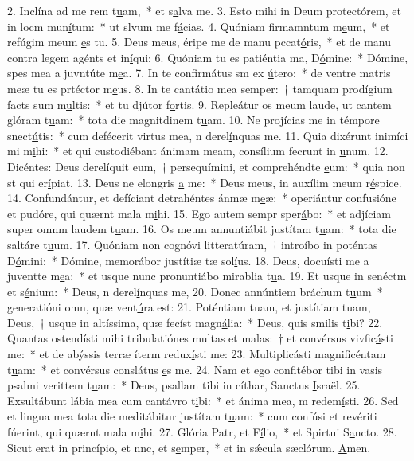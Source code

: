 2. Inclína ad me rem t\uline{u}am,~* et s\uline{a}lva me.
3. Esto mihi in Deum protectórem, et in locm mun\uline{í}tum:~* ut slvum me f\uline{á}cias.
4. Quóniam firmamntum m\uline{e}um,~* et refúgim meum \uline{e}s tu.
5. Deus meus, éripe me de manu pccat\uline{ó}ris,~* et de manu contra legem agénts et in\uline{í}qui:
6. Quóniam tu es patiéntia ma, D\uline{ó}mine:~* Dómine, spes mea a juvntúte m\uline{e}a.
7. In te confirmátus sm ex \uline{ú}tero:~* de ventre matris meæ tu es prtéctor m\uline{e}us.
8. In te cantátio mea semper:~† tamquam prodígium facts sum m\uline{u}ltis:~* et tu djútor f\uline{o}rtis.
9. Repleátur os meum laude, ut cantem glóram t\uline{u}am:~* tota die magnitdinem t\uline{u}am.
10. Ne projícias me in témpore snect\uline{ú}tis:~* cum defécerit virtus mea, n derel\uline{í}nquas me.
11. Quia dixérunt inimíci mi m\uline{i}hi:~* et qui custodiébant ánimam meam, consílium fecrunt in \uline{u}num.
12. Dicéntes: Deus derelíquit eum,~† persequímini, et comprehéndte \uline{e}um:~* quia non st qui er\uline{í}piat.
13. Deus ne elongris \uline{a} me:~* Deus meus, in auxílim meum r\uline{é}spice.
14. Confundántur, et defíciant detrahéntes ánmæ m\uline{e}æ:~* operiántur confusióne et pudóre, qui quærnt mala m\uline{i}hi.
15. Ego autem sempr sper\uline{á}bo:~* et adjíciam super omnm laudem t\uline{u}am.
16. Os meum annuntiábit justítam t\uline{u}am:~* tota die saltáre t\uline{u}um.
17. Quóniam non cognóvi litteratúram,~† introíbo in poténtas D\uline{ó}mini:~* Dómine, memorábor justítiæ tæ sol\uline{í}us.
18. Deus, docuísti me a juventte m\uline{e}a:~* et usque nunc pronuntiábo mirablia t\uline{u}a.
19. Et usque in senéctm et s\uline{é}nium:~* Deus, n derel\uline{í}nquas me,
20. Donec annúntiem bráchum t\uline{u}um~* generatióni omn, quæ vent\uline{ú}ra est:
21. Poténtiam tuam, et justítiam tuam, Deus,~† usque in altíssima, quæ fecíst magn\uline{á}lia:~* Deus, quis smilis t\uline{i}bi?
22. Quantas ostendísti mihi tribulatiónes multas et malas:~† et convérsus vivfic\uline{á}sti me:~* et de abýssis terræ íterm redux\uline{í}sti me:
23. Multiplicásti magnificéntam t\uline{u}am:~* et convérsus conslátus \uline{e}s me.
24. Nam et ego confitébor tibi in vasis psalmi verittem t\uline{u}am:~* Deus, psallam tibi in cíthar, Sanctus \uline{I}sraël.
25. Exsultábunt lábia mea cum cantávro t\uline{i}bi:~* et ánima mea, m redem\uline{í}sti.
26. Sed et lingua mea tota die meditábitur justítam t\uline{u}am:~* cum confúsi et revériti fúerint, qui quærnt mala m\uline{i}hi.
27. Glória Patr, et F\uline{í}lio,~* et Spirtui S\uline{a}ncto.
28. Sicut erat in princípio, et nnc, et s\uline{e}mper,~* et in sǽcula sæclórum. \uline{A}men.
